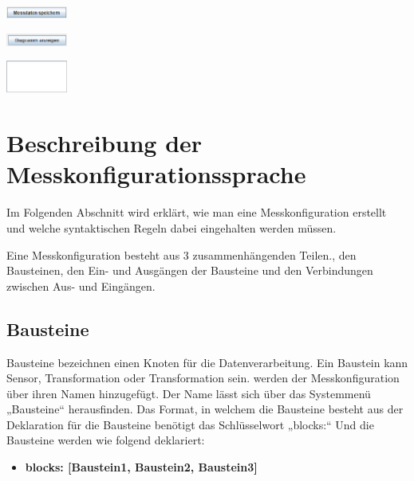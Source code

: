 \documentclass[parskip=full]{scrartcl}
\begin{document}
\begin{flushleft}
    \includegraphics[width = 2cm]{Grafiken/12-Messdaten_speichern.png}
\end{flushleft}

\begin{flushleft}
    \includegraphics[width = 2cm]{Grafiken/13-Diagramm_anzeigen.png}
\end{flushleft}

\begin{flushleft}
    \includegraphics[width = 2cm]{Grafiken/14-Datenanzeige.png}
\end{flushleft}

\section{Beschreibung der Messkonfigurationssprache}


Im Folgenden Abschnitt wird erklärt, wie man eine Messkonfiguration erstellt und welche syntaktischen Regeln dabei eingehalten werden müssen.  

Eine Messkonfiguration besteht aus 3 zusammenhängenden Teilen., den Bausteinen, den Ein- und Ausgängen der Bausteine und den Verbindungen zwischen Aus- und Eingängen.  

\subsection{Bausteine}

Bausteine bezeichnen einen Knoten für die Datenverarbeitung. Ein Baustein kann 
Sensor, Transformation oder Transformation sein. werden der Messkonfiguration über ihren Namen hinzugefügt. Der Name lässt sich über das Systemmenü „Bausteine“ herausfinden.   
Das Format, in welchem die Bausteine besteht aus der Deklaration für die Bausteine benötigt das Schlüsselwort „blocks:“ Und die Bausteine werden wie folgend deklariert: 

\begin{itemize}

\item[ ] \textbf{blocks: [Baustein1, Baustein2, Baustein3]}

\end{itemize}
\end{document}

